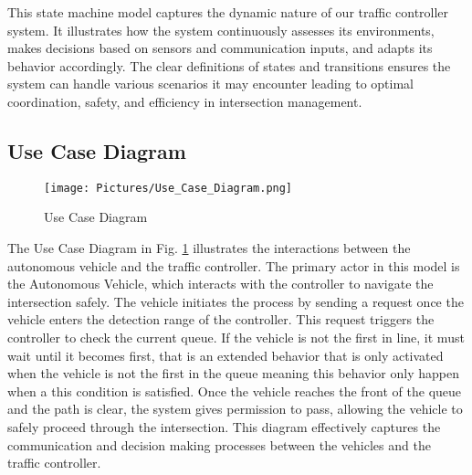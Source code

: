 \documentclass[conference]{IEEEtran}
\begin{document}
This state machine model captures the dynamic nature of our traffic controller system. It illustrates how the system continuously assesses its environments, makes decisions based on sensors and communication inputs, and adapts its behavior accordingly. The clear definitions of states and transitions ensures the system can handle various scenarios it may encounter leading to optimal coordination, safety, and efficiency in intersection management.


\subsection{Use Case Diagram}


\begin{figure}[h!]
    \centering
    \texttt{[image: Pictures/Use\_Case\_Diagram.png]}
    \caption{Use Case Diagram}
    \label{fig:Use Case Diagram}
\end{figure}   

The Use Case Diagram in Fig. \ref{fig:Use Case Diagram} illustrates the interactions between the autonomous vehicle and the traffic controller. The primary actor in this model is the Autonomous Vehicle, which interacts with the controller to navigate the intersection safely. The vehicle initiates the process by sending a request once the vehicle enters the detection range of the controller. This request triggers the controller to check the current queue. If the vehicle is not the first in line, it must wait until it becomes first, that is an extended behavior that is only activated when the vehicle is not the first in the queue meaning this behavior only happen when a this condition is satisfied. Once the vehicle reaches the front of the queue and the path is clear, the system gives permission to pass, allowing the vehicle to safely proceed through the intersection. This diagram effectively captures the communication and decision making processes between the vehicles and the traffic controller.
\end{document}
